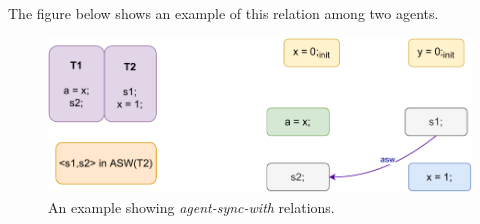             The figure below shows an example of this relation among two agents. 
            \begin{figure}[H]
                \centering
                \includegraphics[scale=0.7]{4.ECMAScriptMemoryModel/AgentSyncWith.pdf}
                \caption{An example showing \textit{agent-sync-with} relations.}
                \label{agent-sync-with}
            \end{figure}
        
